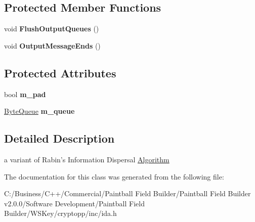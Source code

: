 \subsection*{Protected Member Functions}
\begin{DoxyCompactItemize}
\item 
\hypertarget{class_information_recovery_a8847a35cbee3b070980da7cbecd7b686}{
void {\bfseries FlushOutputQueues} ()}
\label{class_information_recovery_a8847a35cbee3b070980da7cbecd7b686}

\item 
\hypertarget{class_information_recovery_af028b9f5b91853050d4ee85130074cc6}{
void {\bfseries OutputMessageEnds} ()}
\label{class_information_recovery_af028b9f5b91853050d4ee85130074cc6}

\end{DoxyCompactItemize}
\subsection*{Protected Attributes}
\begin{DoxyCompactItemize}
\item 
\hypertarget{class_information_recovery_a8836fa3444af96b7d9a3bc0e45afd4f7}{
bool {\bfseries m\_\-pad}}
\label{class_information_recovery_a8836fa3444af96b7d9a3bc0e45afd4f7}

\item 
\hypertarget{class_information_recovery_a3d12ccc4618e3fa5e0c0412fe2f8f0e1}{
\hyperlink{class_byte_queue}{ByteQueue} {\bfseries m\_\-queue}}
\label{class_information_recovery_a3d12ccc4618e3fa5e0c0412fe2f8f0e1}

\end{DoxyCompactItemize}


\subsection{Detailed Description}
a variant of Rabin's Information Dispersal \hyperlink{class_algorithm}{Algorithm} 

The documentation for this class was generated from the following file:\begin{DoxyCompactItemize}
\item 
C:/Business/C++/Commercial/Paintball Field Builder/Paintball Field Builder v2.0.0/Software Development/Paintball Field Builder/WSKey/cryptopp/inc/ida.h\end{DoxyCompactItemize}
